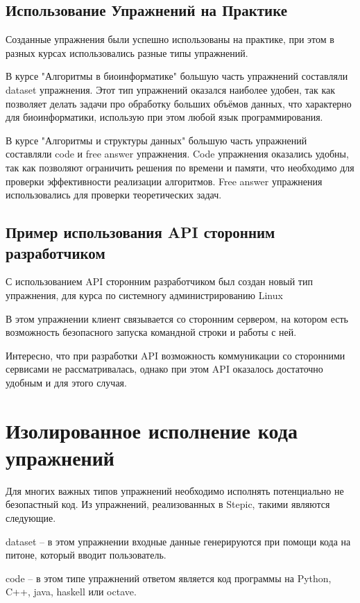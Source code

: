 \documentclass{matmex-diploma-custom}
\begin{document}
\subsection*{Использование Упражнений на Практике}

Созданные упражнения были успешно использованы на практике, при этом в
разных курсах использовались разные типы упражнений.

В курсе "Алгоритмы в биоинформатике" большую часть упражнений
составляли dataset упражнения. Этот тип упражнений оказался наиболее
удобен, так как позволяет делать задачи про обработку больших объёмов
данных, что характерно для биоинформатики, использую при этом любой
язык программирования.

В курсе "Алгоритмы и структуры данных" большую часть упражнений
составляли code и free answer упражнения. Code упражнения оказались
удобны, так как позволяют ограничить решения по времени и памяти, что
необходимо для проверки эффективности реализации алгоритмов. Free
answer упражнения использовались для проверки теоретических задач.

\subsection{Пример использования API сторонним разработчиком}

С использованием API сторонним разработчиком был создан новый тип
упражнения, для курса по системногу администрированию Linux

В этом упражнении клиент связывается со сторонним
сервером, на котором есть возможность безопасного запуска командной
строки и работы с ней.

Интересно, что при разработки API возможность коммуникации
со сторонними сервисами не рассматривалась, однако при этом API
оказалось достаточно удобным и для этого случая.

\section{Изолированное исполнение кода упражнений}

Для многих важных типов упражнений необходимо исполнять потенциально
не безопастный код. Из упражнений, реализованных в Stepic, такими
являются следующие.

dataset -- в этом упражнении входные данные генерируются при помощи
кода на питоне, который вводит пользователь.

code -- в этом типе упражнений ответом является код программы на
Python, C++, java, haskell или octave.
\end{document}
